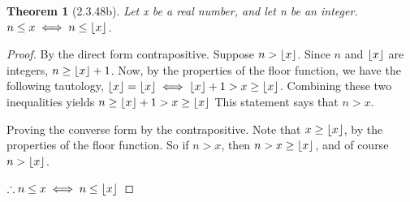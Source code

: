 \documentclass[a4paper, 12pt]{article}
\theoremstyle{plain}
\newtheorem*{theorem*}{Theorem}
\DeclarePairedDelimiter{\floor}{\lfloor}{\rfloor}
\begin{document}
	
	\begin{theorem*}[2.3.48b]
		Let x be a real number, and let n be an integer. \newline $n \le x \iff n \le \floor{x}$.
	\end{theorem*}
	
	\begin{proof}
		By the direct form contrapositive. Suppose $n > \floor{x}$. Since $n$ and $\floor{x}$ are 
		integers, $n \ge \floor{x} + 1$. Now, by the properties of the floor function, we have the 
		following tautology, $\floor{x} = \floor{x} \iff \floor{x} + 1 > x \ge \floor{x}$. 
		Combining these two inequalities yields $n \ge \floor{x} + 1 > x \ge \floor{x}$ This 
		statement says that $n > x$.
		
		Proving the converse form by the contrapositive. Note that $x \ge \floor{x}$, by the 
		properties of the floor function. So if $n > x$, then $n > x \ge \floor{x}$, and of course 
		$n > \floor{x}$.
		
		$\therefore n \le x \iff n \le \floor{x}$
	\end{proof}
\end{document}
